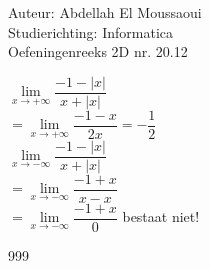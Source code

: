 \documentclass[a4paper]{article}
\begin{document}
  
\noindent \large Auteur: Abdellah El Moussaoui \\
\noindent \large Studierichting: Informatica\\
\noindent \large Oefeningenreeks 2D nr. 20.12\\

\medskip

\normalsize

$\lim\limits_{x \rightarrow +\infty} \dfrac{-1 - \left| x \right|}{x + \left| x \right|}$\\

$ = \lim\limits_{x \rightarrow +\infty} \dfrac{-1 - x}{2x} = -\dfrac{1}{2}$\\

$\lim\limits_{x \rightarrow -\infty} \dfrac{-1 - \left| x \right|}{x + \left| x \right|}$\\

$ = \lim\limits_{x \rightarrow -\infty} \dfrac{-1 + x}{x - x} $\\

$ = \lim\limits_{x \rightarrow -\infty} \dfrac{-1 + x}{0}$
 bestaat niet!


\begin{thebibliography}{999}
\end{thebibliography}
\end{document}
